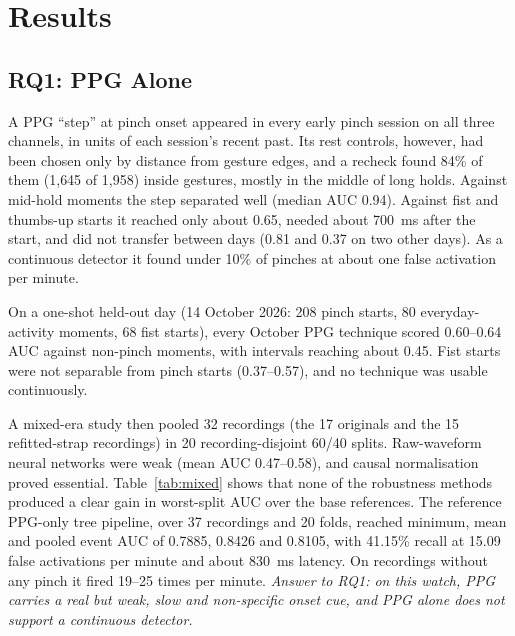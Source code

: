 \section{Results}\label{sec:results}

\subsection{RQ1: PPG Alone}

A PPG ``step'' at pinch onset appeared in every early pinch session on all three channels, in units of each session's recent past. Its rest controls, however, had been chosen only by distance from gesture edges, and a recheck found 84\% of them (1{,}645 of 1{,}958) inside gestures, mostly in the middle of long holds. Against mid-hold moments the step separated well (median AUC 0.94). Against fist and thumbs-up starts it reached only about 0.65, needed about 700~ms after the start, and did not transfer between days (0.81 and 0.37 on two other days). As a continuous detector it found under 10\% of pinches at about one false activation per minute.

On a one-shot held-out day (14 October 2026: 208 pinch starts, 80 everyday-activity moments, 68 fist starts), every October PPG technique scored 0.60--0.64 AUC against non-pinch moments, with intervals reaching about 0.45. Fist starts were not separable from pinch starts (0.37--0.57), and no technique was usable continuously.

A mixed-era study then pooled 32 recordings (the 17 originals and the 15 refitted-strap recordings) in 20 recording-disjoint 60/40 splits. Raw-waveform neural networks were weak (mean AUC 0.47--0.58), and causal normalisation proved essential. Table~\ref{tab:mixed} shows that none of the robustness methods produced a clear gain in worst-split AUC over the base references. The reference PPG-only tree pipeline, over 37 recordings and 20 folds, reached minimum, mean and pooled event AUC of 0.7885, 0.8426 and 0.8105, with 41.15\% recall at 15.09 false activations per minute and about 830~ms latency. On recordings without any pinch it fired 19--25 times per minute. \emph{Answer to RQ1: on this watch, PPG carries a real but weak, slow and non-specific onset cue, and PPG alone does not support a continuous detector.}

